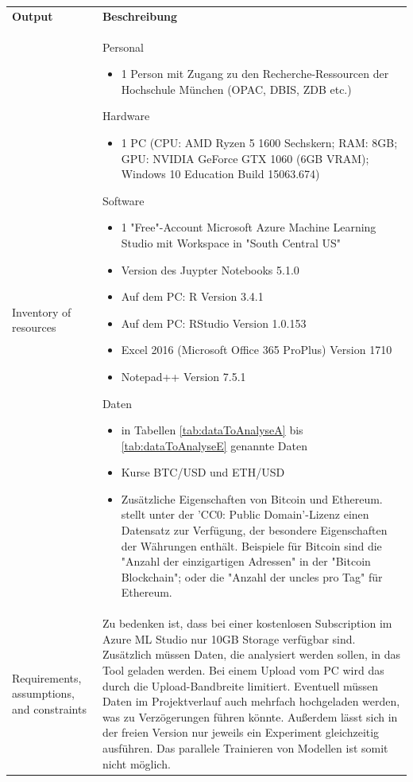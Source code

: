 \begin{centering} \footnotesize \begin{longtable}[H]{|p{3cm}|p{13cm}|}
\hline
\textbf{Output} & \textbf{Beschreibung} \\ 
\hhline{==}
Inventory of resources & Personal
\begin{itemize}
\item 1 Person mit Zugang zu den Recherche-Ressourcen der Hochschule München (OPAC, DBIS, ZDB etc.\citep{hochschulemunchen_hochschule_2017})
\end{itemize}
Hardware
\begin{itemize}
\item 1 PC (CPU: AMD Ryzen 5 1600 Sechskern; RAM: 8GB; GPU: NVIDIA GeForce GTX 1060 (6GB VRAM); Windows 10 Education Build 15063.674)
\end{itemize}
Software
\begin{itemize}
\item 1 "Free"-Account Microsoft Azure Machine Learning Studio mit Workspace in "South Central US"
\item Version des Juypter Notebooks 5.1.0
\item Auf dem PC: R Version 3.4.1
\item Auf dem PC: RStudio Version 1.0.153
\item Excel 2016 (Microsoft Office 365 ProPlus) Version 1710
\item Notepad++ Version 7.5.1
\end{itemize}
Daten
\begin{itemize}
\item in Tabellen \ref{tab:dataToAnalyseA} bis  \ref{tab:dataToAnalyseE} genannte Daten
\item Kurse BTC/USD und ETH/USD
\item Zusätzliche Eigenschaften von Bitcoin und Ethereum. \citep{kumar_cryptocurrency_2017} stellt unter der 'CC0: Public Domain'-Lizenz einen Datensatz zur Verfügung, der besondere Eigenschaften der Währungen enthält. Beispiele für Bitcoin sind die "Anzahl der einzigartigen Adressen" in der "Bitcoin Blockchain"; oder die "Anzahl der uncles pro Tag"\citep[eigene Übersetzung]{kumar_cryptocurrency_2017} für Ethereum.
\end{itemize}
\\
\hline
Requirements, assumptions, and constraints & Zu bedenken ist, dass bei einer kostenlosen Subscription im Azure ML Studio nur 10GB Storage verfügbar sind. Zusätzlich müssen Daten, die analysiert werden sollen, in das Tool geladen werden. Bei einem Upload vom PC wird das durch die Upload-Bandbreite limitiert. Eventuell müssen Daten im Projektverlauf auch mehrfach hochgeladen werden, was zu Verzögerungen führen könnte. Außerdem lässt sich in der freien Version nur jeweils ein Experiment gleichzeitig ausführen. Das parallele Trainieren von Modellen ist somit nicht möglich.\newline 

\end{longtable}
\end{centering}
